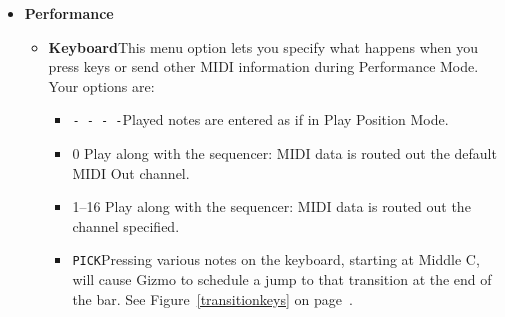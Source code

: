 \documentclass{article}
\begin{document}
\begin{itemize}

\setlength{\leftskip}{0em}
\item {\bf Performance} 
\begin{itemize}
\item {\bf Keyboard}\quad  This menu option lets you specify what happens when you press keys or send other MIDI information during Performance Mode.  Your options are:

 \renewcommand\labelitemiii{$\diamond$}
\begin{itemize}
	\item {\texttt{-~-~-~-}}\quad Played notes are entered as if in Play Position Mode.
	\item {0} \quad Play along with the sequencer: MIDI data is routed out the default MIDI Out channel.
	\item {1--16} \quad Play along with the sequencer: MIDI data is routed out the channel specified.
	\item {\texttt{PICK}}\quad Pressing various notes on the keyboard, starting at Middle C, will cause Gizmo to schedule a jump to that transition at the end of the bar.  See Figure~\ref{transitionkeys} on page~\pageref*{transitionkeys}.
\end{itemize}


\end{itemize}
\end{itemize}
\end{document}
